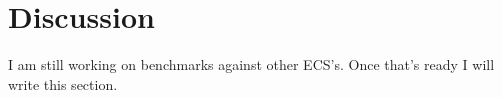 \section{Discussion}
I am still working on benchmarks against other ECS's. Once that's ready I will write this section.